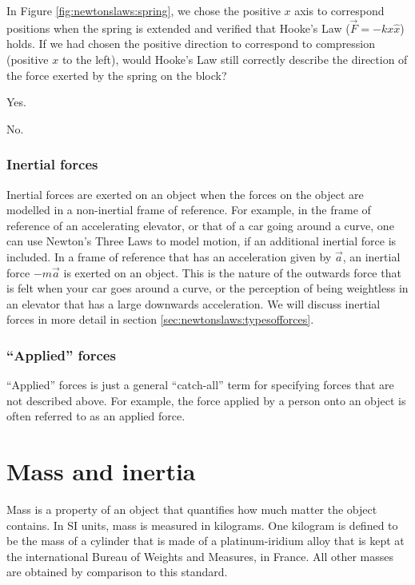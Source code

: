 \begin{checkpoint}
\begin{MCquestion}{In Figure \ref{fig:newtonslaws:spring}, we chose the positive $x$ axis to correspond positions when the spring is extended and verified that Hooke's Law ($\vec F=-kx\hat x$) holds. If we had chosen the positive direction to correspond to compression (positive $x$ to the left), would Hooke's Law still correctly describe the direction of the force exerted by the spring on the block?}
\item Yes. %
\item No.
\end{MCquestion}
\end{checkpoint}

\subsubsection{Inertial forces}
Inertial forces are exerted on an object when the forces on the object are modelled in a non-inertial frame of reference. For example, in the frame of reference of an accelerating elevator, or that of a car going around a curve, one can use Newton's Three Laws to model motion, if an additional inertial force is included. In a frame of reference that has an acceleration given by $\vec a$, an inertial force $-m\vec a$ is exerted on an object. This is the nature of the outwards force that is felt when your car goes around a curve, or the perception of being weightless in an elevator that has a large downwards acceleration. We will discuss inertial forces in more detail in section \ref{sec:newtonslaws:typesofforces}.


\subsubsection{``Applied'' forces}
``Applied'' forces is just a general ``catch-all'' term for specifying forces that are not described above. For example, the force applied by a person onto an object is often referred to as an applied force. 

\section{Mass and inertia}
Mass is a property of an object that quantifies how much matter the object contains. In SI units, mass is measured in kilograms. One kilogram is defined to be the mass of a cylinder that is made of a platinum-iridium alloy that is kept at the international Bureau of Weights and Measures, in France. All other masses are obtained by comparison to this standard. 

